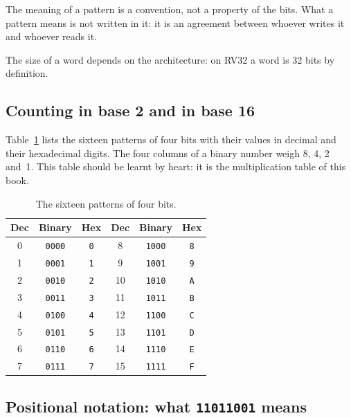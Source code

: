 \begin{prgconcept}
The meaning of a pattern is a convention, not a property of the bits. What a
pattern means is not written in it: it is an agreement between whoever writes
it and whoever reads it.
\end{prgconcept}

The size of a word depends on the architecture: on RV32 a word is 32 bits by
definition.

\subsection{Counting in base 2 and in base 16}

Table~\ref{tab:info:hex} lists the sixteen patterns of four bits with their
values in decimal and their hexadecimal digits. The four columns of a binary
number weigh 8, 4, 2 and~1. This table should be learnt by heart: it is the
multiplication table of this book.

\begin{table}[htb]
\centering\small
\caption{The sixteen patterns of four bits.}\label{tab:info:hex}
\begin{tabular}{@{}ccc@{\qquad\qquad}ccc@{}}
\toprule
\textbf{Dec} & \textbf{Binary} & \textbf{Hex} & \textbf{Dec} & \textbf{Binary} & \textbf{Hex}\\
\midrule
0 & \texttt{0000} & \texttt{0} & 8 & \texttt{1000} & \texttt{8}\\
1 & \texttt{0001} & \texttt{1} & 9 & \texttt{1001} & \texttt{9}\\
2 & \texttt{0010} & \texttt{2} & 10 & \texttt{1010} & \texttt{A}\\
3 & \texttt{0011} & \texttt{3} & 11 & \texttt{1011} & \texttt{B}\\
4 & \texttt{0100} & \texttt{4} & 12 & \texttt{1100} & \texttt{C}\\
5 & \texttt{0101} & \texttt{5} & 13 & \texttt{1101} & \texttt{D}\\
6 & \texttt{0110} & \texttt{6} & 14 & \texttt{1110} & \texttt{E}\\
7 & \texttt{0111} & \texttt{7} & 15 & \texttt{1111} & \texttt{F}\\
\bottomrule
\end{tabular}
\end{table}

\subsection{Positional notation: what \texttt{11011001} means}

